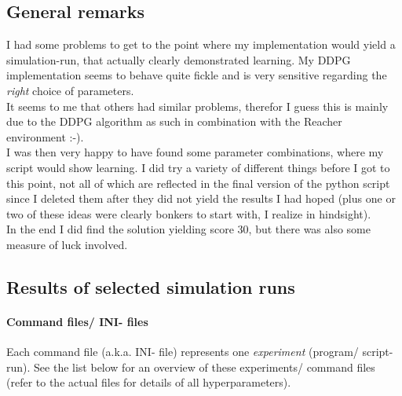 \documentclass[a4paper]{article}
\begin{document}
\subsection{General remarks}
I had some problems to get to the point where my implementation would yield
a simulation-run, that actually clearly demonstrated learning. My DDPG implementation
seems to behave quite fickle and is very sensitive regarding the \textit{right}
choice of parameters.\\
It seems to me that others had similar problems, therefor I guess this is
mainly due to the DDPG algorithm as such in combination with the Reacher environment :-).
\\
I was then very happy to have found some parameter combinations, where my
script would show learning. I did try a variety of different things before
I got to this point, not all of which are reflected in the final version
of the python script since I deleted them after they did not yield
the results I had hoped (plus one or two of these ideas were clearly bonkers
to start with, I realize in hindsight).
\\
In the end I did find the solution yielding score 30, but there was also some
measure of luck involved.

\subsection{Results of selected simulation runs}

\paragraph{Command files/ INI- files}
Each command file (a.k.a. INI- file) represents one \textit{experiment} (program/ script- run).
See the list below for an overview of these experiments/ command files
(refer to the actual files for details of all hyperparameters).
\\
\end{document}
